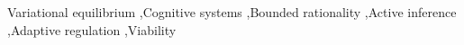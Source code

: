 \begin{keyword}
Variational equilibrium \sep Cognitive systems \sep Bounded rationality \sep Active inference \sep Adaptive regulation \sep Viability
\end{keyword}
